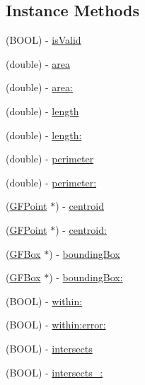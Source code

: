 \subsection*{Instance Methods}
\begin{DoxyCompactItemize}
\item 
(B\+O\+O\+L) -\/ \hyperlink{interface_g_f_geometry_a3a63de5905eae52356c6afd7313e4828}{is\+Valid}
\item 
(double) -\/ \hyperlink{interface_g_f_geometry_a0028dc3b2c2315a24d803dfa4cf2250e}{area}
\item 
(double) -\/ \hyperlink{interface_g_f_geometry_ace87d1a855e679bc7dad8efe01de05d9}{area\+:}
\item 
(double) -\/ \hyperlink{interface_g_f_geometry_ab68dd3c418a3f06c6593d02dfebe2585}{length}
\item 
(double) -\/ \hyperlink{interface_g_f_geometry_a85cbb192882c5bcf6eede5caa0d3083e}{length\+:}
\item 
(double) -\/ \hyperlink{interface_g_f_geometry_a31593eea12da7a9ed46b2dd4e6ca511e}{perimeter}
\item 
(double) -\/ \hyperlink{interface_g_f_geometry_a746be63604d2e7563d17c1728c8fb8bf}{perimeter\+:}
\item 
(\hyperlink{interface_g_f_point}{G\+F\+Point} $\ast$) -\/ \hyperlink{interface_g_f_geometry_af53b7bf19dfea6827eed19a7979c7dca}{centroid}
\item 
(\hyperlink{interface_g_f_point}{G\+F\+Point} $\ast$) -\/ \hyperlink{interface_g_f_geometry_a2c72f4e2f67d3cf79514e47f0973c10c}{centroid\+:}
\item 
(\hyperlink{interface_g_f_box}{G\+F\+Box} $\ast$) -\/ \hyperlink{interface_g_f_geometry_a808ba7daf6d4c3d742668ad3fe5d0f0e}{bounding\+Box}
\item 
(\hyperlink{interface_g_f_box}{G\+F\+Box} $\ast$) -\/ \hyperlink{interface_g_f_geometry_a845ecba0fb20deca5dcaf3350329bf94}{bounding\+Box\+:}
\item 
(B\+O\+O\+L) -\/ \hyperlink{interface_g_f_geometry_a832350c76f4a42a39889c9138108edd2}{within\+:}
\item 
(B\+O\+O\+L) -\/ \hyperlink{interface_g_f_geometry_a472aa2dddf6c10eec974d9851d186c06}{within\+:error\+:}
\item 
(B\+O\+O\+L) -\/ \hyperlink{interface_g_f_geometry_a3735ea20bc337cff79944bbe08f3bdf0}{intersects}
\item 
(B\+O\+O\+L) -\/ \hyperlink{interface_g_f_geometry_ac17c7387894066850c7cca9d3545be61}{intersects\+\_\+\+:}
\item 

\end{DoxyCompactItemize}
